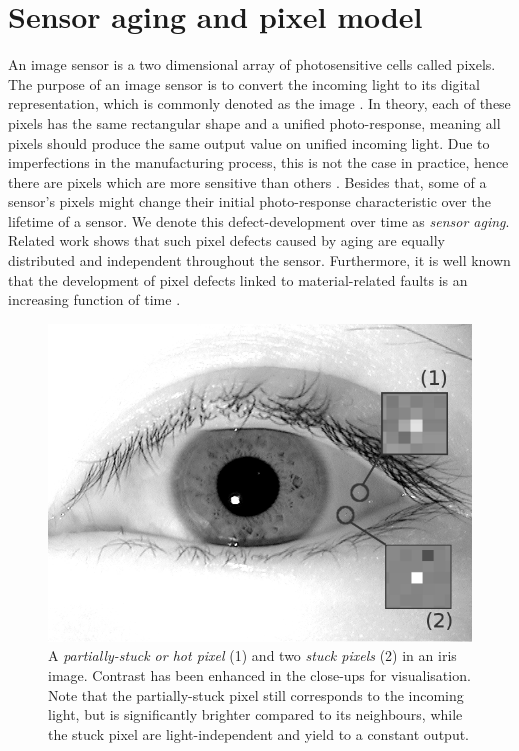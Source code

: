 \documentclass[10pt,twocolumn,letterpaper]{article}
\begin{document}
\section{Sensor aging and pixel model}
\label{sec:agingAndPixelModel}
An image sensor is a two dimensional array of photosensitive cells called pixels. The purpose of an image sensor is to convert the incoming light to its digital representation, which is commonly denoted as the image \cite{imageSensors}. In theory, each of these pixels has the same rectangular shape and a unified photo-response, meaning all pixels should produce the same output value on unified incoming light. Due to imperfections in the manufacturing process, this is not the case in practice, hence there are pixels which are more sensitive than others \cite{camAndDisplays}. Besides that, some of a sensor's pixels might change their initial photo-response characteristic over the lifetime of a sensor. We denote this defect-development over time as \emph{sensor aging}.
Related work shows that such pixel defects caused by aging are equally distributed and independent throughout the sensor. Furthermore, it is well known that the development of pixel defects linked to material-related faults is an increasing function of time \cite{datingImages, inFieldDefects, defectDetection,failureSemi, defectIdentification, fridrich}.

\begin{figure}
\centering
\includegraphics[width=\linewidth]{img/defects.png}
\caption{A \emph{partially-stuck or hot pixel} (1) and two \emph{stuck pixels} (2) in an iris image. Contrast has been enhanced in the close-ups for visualisation. Note that the partially-stuck pixel still corresponds to the incoming light, but is significantly brighter compared to its neighbours, while the stuck pixel are light-independent and yield to a constant output.  }
\label{fig:hotStuck}
\end{figure}
\end{document}
